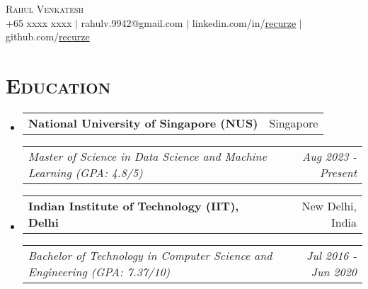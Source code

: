 \documentclass[11pt]{article}
\makeatletter
\newcommand{\headerrow}[2]
{\begin{tabular*}{\linewidth}{l@{\extracolsep{\fill}}r}
    #1 &
    #2 \\
\end{tabular*}}
\makeatother
\begin{document}
\thispagestyle{empty}

\begin{center}
    {\huge \textsc{Rahul Venkatesh}} \\[2pt]
    +65 xxxx xxxx
    $\mid$
    rahulv.9942@gmail.com
    $\mid$
    linkedin.com/in/\href{https://www.linkedin.com/in/recurze}{recurze}
    $\mid$
    github.com/\href{https://github.com/recurze}{recurze}
\end{center}

\section*{\textsc{\textbf{Education}}}
\begin{itemize}[leftmargin=0em]

\item[]
    \headerrow {\textbf{National University of Singapore (NUS)}}{Singapore}
    \headerrow {\emph{Master of Science in Data Science and Machine Learning (GPA: 4.8/5)}}{\emph{Aug 2023 - Present}}

\item[]
    \headerrow {\textbf{Indian Institute of Technology (IIT), Delhi}}{New Delhi, India}
    \headerrow {\emph{Bachelor of Technology in Computer Science and Engineering (GPA: 7.37/10)}}{\emph{Jul 2016 - Jun 2020}}

\end{itemize}

%
\end{document}
